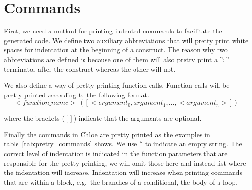\section{Commands}
First, we need a method for printing indented commands to facilitate the generated code.
We define two auxiliary abbreviations that will pretty print white spaces for indentation at the beginning of a construct.
The reason why two abbreviations are defined is because one of them will also pretty print a $";"$ terminator after the construct whereas the other will not.

We also define a way of pretty printing function calls.
Function calls will be pretty printed according to the following format:
\begin{equation*}
<function\_name>\ ([<argument_0, argument_1, \dots, <argument_n>])
\end{equation*}

where the brackets ($[]$) indicate that the arguments are optional.

Finally the commands in Chloe are pretty printed as the examples in table~\ref{tab:pretty_commands} shows.
We use $''$ to indicate an empty string.
The correct level of indentation is indicated in the function parameters that are responsible for the pretty printing, we will omit those here and instead list where the indentation will increase.
Indentation will increase when printing commands that are within a block, e.g.\ the branches of a conditional, the body of a loop.

